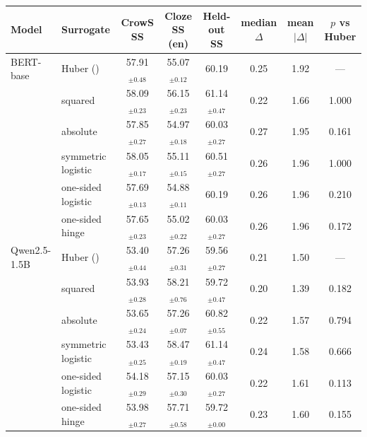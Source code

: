   \footnotesize\setlength{\tabcolsep}{4pt}
  \begin{tabular}{@{}llcccccc@{}}
    \toprule
    Model & Surrogate & CrowS SS & Cloze SS (en) & Held-out SS & median $\Delta$ & mean $|\Delta|$ & $p$ vs Huber \\
    \midrule
    BERT-base & Huber (\PEAT{}) & 57.91$_{\pm 0.48}$ & 55.07$_{\pm 0.12}$ & 60.19 & 0.25 & 1.92 & --- \\
     & squared & 58.09$_{\pm 0.23}$ & 56.15$_{\pm 0.23}$ & 61.14$_{\pm 0.47}$ & 0.22 & 1.66 & 1.000 \\
     & absolute & 57.85$_{\pm 0.27}$ & 54.97$_{\pm 0.18}$ & 60.03$_{\pm 0.27}$ & 0.27 & 1.95 & 0.161 \\
     & symmetric logistic & 58.05$_{\pm 0.17}$ & 55.11$_{\pm 0.15}$ & 60.51$_{\pm 0.27}$ & 0.26 & 1.96 & 1.000 \\
     & one-sided logistic & 57.69$_{\pm 0.13}$ & 54.88$_{\pm 0.11}$ & 60.19 & 0.26 & 1.96 & 0.210 \\
     & one-sided hinge & 57.65$_{\pm 0.23}$ & 55.02$_{\pm 0.22}$ & 60.03$_{\pm 0.27}$ & 0.26 & 1.96 & 0.172 \\
    \midrule
    Qwen2.5-1.5B & Huber (\PEAT{}) & 53.40$_{\pm 0.44}$ & 57.26$_{\pm 0.31}$ & 59.56$_{\pm 0.27}$ & 0.21 & 1.50 & --- \\
     & squared & 53.93$_{\pm 0.28}$ & 58.21$_{\pm 0.76}$ & 59.72$_{\pm 0.47}$ & 0.20 & 1.39 & 0.182 \\
     & absolute & 53.65$_{\pm 0.24}$ & 57.26$_{\pm 0.07}$ & 60.82$_{\pm 0.55}$ & 0.22 & 1.57 & 0.794 \\
     & symmetric logistic & 53.43$_{\pm 0.25}$ & 58.47$_{\pm 0.19}$ & 61.14$_{\pm 0.47}$ & 0.24 & 1.58 & 0.666 \\
     & one-sided logistic & 54.18$_{\pm 0.29}$ & 57.15$_{\pm 0.30}$ & 60.03$_{\pm 0.27}$ & 0.22 & 1.61 & 0.113 \\
     & one-sided hinge & 53.98$_{\pm 0.27}$ & 57.71$_{\pm 0.58}$ & 59.72$_{\pm 0.00}$ & 0.23 & 1.60 & 0.155 \\
    \bottomrule
  \end{tabular}
